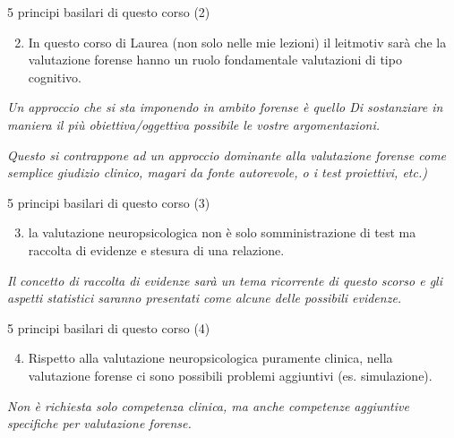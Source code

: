 \documentclass[
  ignorenonframetext,
]{beamer}
\providecommand{\tightlist}{%
  \setlength{\itemsep}{0pt}\setlength{\parskip}{0pt}}
\begin{document}
\begin{frame}{5 principi basilari di questo corso (2)}
\label{principi-basilari-di-questo-corso-2}
\begin{enumerate}
\setcounter{enumi}{1}
\tightlist
\item
  In questo corso di Laurea (non solo nelle mie lezioni) il leitmotiv
  sarà che la valutazione forense hanno un ruolo fondamentale
  valutazioni di tipo cognitivo.
\end{enumerate}

\vspace{3em}

\emph{Un approccio che si sta imponendo in ambito forense è quello Di
sostanziare in maniera il più obiettiva/oggettiva possibile le vostre
argomentazioni.}

\emph{Questo si contrappone ad un approccio dominante alla valutazione
forense come semplice giudizio clinico, magari da fonte autorevole, o i
test proiettivi, etc.)}
\end{frame}

\begin{frame}{5 principi basilari di questo corso (3)}
\label{principi-basilari-di-questo-corso-3}
\begin{enumerate}
\setcounter{enumi}{2}
\tightlist
\item
  la valutazione neuropsicologica non è solo somministrazione di test ma
  raccolta di evidenze e stesura di una relazione.
\end{enumerate}

\vspace{3em}

\emph{Il concetto di raccolta di evidenze sarà un tema ricorrente di
questo scorso e gli aspetti statistici saranno presentati come alcune
delle possibili evidenze.}
\end{frame}

\begin{frame}{5 principi basilari di questo corso (4)}
\label{principi-basilari-di-questo-corso-4}
\begin{enumerate}
\setcounter{enumi}{3}
\tightlist
\item
  Rispetto alla valutazione neuropsicologica puramente clinica, nella
  valutazione forense ci sono possibili problemi aggiuntivi (es.
  simulazione). \vspace{3em}
\end{enumerate}

\emph{Non è richiesta solo competenza clinica, ma anche competenze
aggiuntive specifiche per valutazione forense.}
\end{frame}
\end{document}
